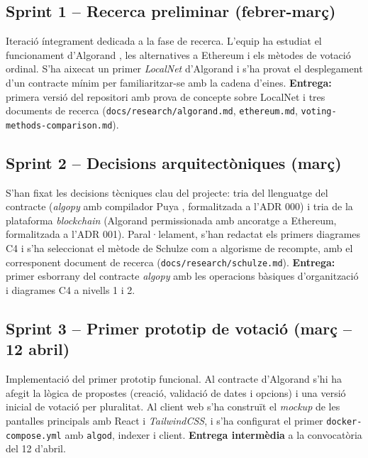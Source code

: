 \subsection{Sprint 1 -- Recerca preliminar (febrer-març)}

Iteració íntegrament dedicada a la fase de recerca. L'equip ha
estudiat el funcionament d'Algorand
\cite{chen2017algorand,algorandfoundation2024algokit}, les
alternatives a Ethereum \cite{buterin2014ethereum} i els mètodes de
votació ordinal. S'ha aixecat un primer \emph{LocalNet} d'Algorand i
s'ha provat el desplegament d'un contracte mínim per familiaritzar-se
amb la cadena d'eines. \textbf{Entrega:} primera versió del repositori
amb prova de concepte sobre LocalNet i tres documents de recerca
(\texttt{docs/research/algorand.md}, \texttt{ethereum.md},
\texttt{voting-methods-comparison.md}).

\subsection{Sprint 2 -- Decisions arquitectòniques (març)}

S'han fixat les decisions tècniques clau del projecte: tria del
llenguatge del contracte (\emph{algopy} amb compilador Puya
\cite{algorandfoundation2024puya}, formalitzada a l'\ac{ADR} 000) i
tria de la plataforma \emph{blockchain} (Algorand permissionada amb
ancoratge a Ethereum, formalitzada a l'\ac{ADR} 001). Paral·lelament,
s'han redactat els primers diagrames C4 \cite{brown2018c4} i s'ha
seleccionat el mètode de Schulze \cite{schulze2011newmethod} com a
algorisme de recompte, amb el corresponent document de recerca
(\texttt{docs/research/schulze.md}). \textbf{Entrega:} primer esborrany
del contracte \emph{algopy} amb les operacions bàsiques d'organització
i diagrames C4 a nivells 1 i 2.

\subsection{Sprint 3 -- Primer prototip de votació (març -- 12 abril)}

Implementació del primer prototip funcional. Al contracte d'Algorand
s'hi ha afegit la lògica de propostes (creació, validació de dates i
opcions) i una versió inicial de votació per pluralitat. Al client
web s'ha construït el \emph{mockup} de les pantalles principals amb
React i \emph{TailwindCSS}, i s'ha configurat el primer
\texttt{docker-compose.yml} amb \texttt{algod}, indexer i client.
\textbf{Entrega intermèdia} a la convocatòria del 12 d'abril.

